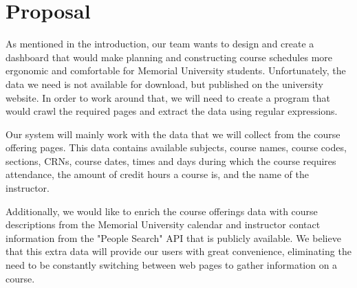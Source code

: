 \documentclass[12pt]{article}
\begin{document}
\section{Proposal}
As mentioned in the introduction, our team wants to design and create a dashboard that would make planning and constructing course schedules more ergonomic and comfortable for Memorial University students. Unfortunately, the data we need is not available for download, but published on the university website. In order to work around that, we will need to create a program that would crawl the required pages and extract the data using regular expressions. \par
Our system will mainly work with the data that we will collect from the course offering pages. This data contains available subjects, course names, course codes, sections, CRNs, course dates, times and days during which the course requires attendance, the amount of credit hours a course is, and the name of the instructor. \par
Additionally, we would like to enrich the course offerings data with course descriptions from the Memorial University calendar and instructor contact information from the "People Search" API that is publicly available. We believe that this extra data will provide our users with great convenience, eliminating the need to be constantly switching between web pages to gather information on a course.  
\end{document}
